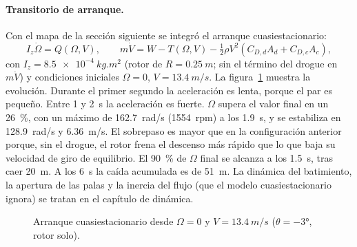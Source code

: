 \paragraph{Transitorio de arranque.} Con el mapa de la sección siguiente se integró el
arranque cuasiestacionario:
\begin{equation}
  I_z\dot\Omega=Q(\Omega,V),\qquad m\dot V=W-T(\Omega,V)-\tfrac12\rho V^2(C_{D,d}A_d+C_{D,c}A_c),
  \label{eq:bemt-trans}
\end{equation}
con $I_z=\SI{8.5e-4}{kg.m^2}$ (rotor de $R=\SI{0.25}{m}$; sin el término del drogue en
$m\dot V$) y condiciones iniciales $\Omega=0$, $V=\SI{13.4}{m/s}$. La
figura~\ref{fig:bemt-trans} muestra la evolución. Durante el primer segundo la aceleración
es lenta, porque el par es pequeño. Entre 1 y \SI{2}{s} la aceleración es fuerte.
$\Omega$ supera el valor final en un \SI{26}{\percent}, con un máximo de
\SI{162.7}{rad/s} (\num{1554}~rpm) a los \SI{1.9}{s}, y se estabiliza en \SI{128.9}{rad/s} y
\SI{6.36}{m/s}. El sobrepaso es mayor que en la configuración anterior porque, sin el
drogue, el rotor frena el descenso más rápido que lo que baja su velocidad de giro de
equilibrio. El \SI{90}{\percent} de $\Omega$ final se alcanza a los \SI{1.5}{s}, tras caer
\SI{20}{m}. A los \SI{6}{s} la caída acumulada es de \SI{51}{m}. La dinámica
del batimiento, la apertura de las palas y la inercia del flujo (que el modelo
cuasiestacionario ignora) se tratan en el capítulo de dinámica.

\begin{figure}[H]
\centering
{}
\caption{Arranque cuasiestacionario desde $\Omega=0$ y $V=\SI{13.4}{m/s}$
($\theta=\ang{-3}$, rotor solo).}
\label{fig:bemt-trans}
\end{figure}

